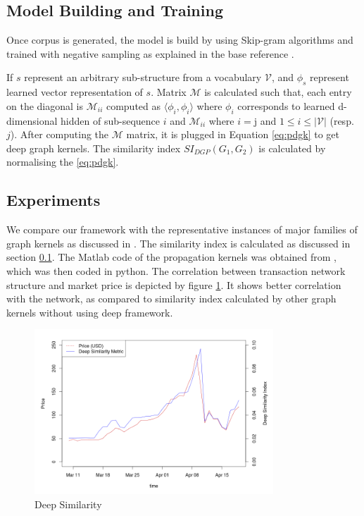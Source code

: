 \subsection{Model Building and Training}
\label{ssec:MBT}
Once corpus is generated, the model is build by using  Skip-gram algorithms and trained with negative sampling as explained in the base reference \citep{Yanardag2015}. 

If $s$ represent an arbitrary sub-structure from a vocabulary $\mathcal{V}$, and $\phi_{s}$ represent learned vector representation of $s$. Matrix $\mathcal{M}$ is calculated such that, each entry on the diagonal is $\mathcal{M}_{ii}$ computed as $\big \langle \phi_{i},\phi_{i} \big \rangle$ where $\phi_{i}$ corresponds
to learned d-dimensional hidden of sub-sequence $i$ and $\mathcal{M}_{ii}$
where $i = $j and $1 \leq i \leq |\mathcal{V}|$ (resp. $j$). After computing the $\mathcal{M}$ matrix, it is plugged in Equation \ref{eq:pdgk} to get deep graph kernels. The similarity index $SI_{DGP}(G_{1}, G_{2})$ is calculated by normalising the \ref{eq:pdgk}.


\subsection{Experiments}
We compare our framework with the representative instances of
major families of graph kernels as discussed in \citep{Yanardag2015}. The similarity index is calculated as discussed in section \ref{ssec:MBT}. The Matlab code of the propagation kernels was obtained from \citep{Neumann2015}, which was then coded in python. The correlation between transaction network structure and market price is depicted by figure \ref{fig:ds}. It shows better correlation with the network, as compared to similarity index calculated by other graph kernels without using deep framework. 

\begin{figure}[ht]
\begin{center}
\includegraphics[width=0.8\textwidth]{./Figures/ds.png}
\caption{Deep Similarity}
\label{fig:ds}
\end{center}
\end{figure}

